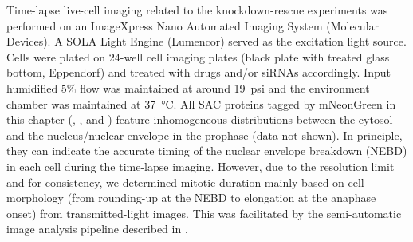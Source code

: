 Time-lapse live-cell imaging related to the knockdown-rescue experiments was performed on an ImageXpress Nano Automated Imaging System (Molecular Devices). A SOLA Light Engine (Lumencor) served as the excitation light source. Cells were plated on 24-well cell imaging plates (black plate with treated glass bottom, Eppendorf) and treated with drugs and/or siRNAs accordingly. Input humidified $5\%$  flow was maintained at around \SI{19}{psi} and the environment chamber was maintained at \SI{37}{\celsius}. All SAC proteins tagged by mNeonGreen in this chapter (, , and ) feature inhomogeneous distributions between the cytosol and the nucleus/nuclear envelope in the prophase (data not shown). In principle, they can indicate the accurate timing of the nuclear envelope breakdown (NEBD) in each cell during the time-lapse imaging. However, due to the resolution limit and for consistency, we determined mitotic duration mainly based on cell morphology (from rounding-up at the NEBD to elongation at the anaphase onset) from transmitted-light images. This was facilitated by the semi-automatic image analysis pipeline described in . %

